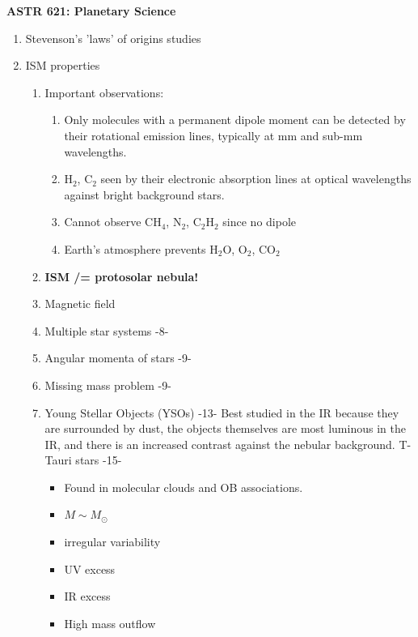 \documentclass[12pt]{article}
\begin{document}
\textbf{ASTR 621: Planetary Science}

\begin{enumerate}
    \item Stevenson's 'laws' of origins studies
    \item ISM properties
        \begin{enumerate}
            \item Important observations:
                \begin{enumerate}
                    \item Only molecules with a permanent dipole moment can be detected by
                        their rotational emission lines, typically at mm and sub-mm
                        wavelengths.
                    \item H$_{2}$, C$_{2}$ seen by their electronic absorption lines at
                        optical wavelengths against bright background stars.
                    \item Cannot observe CH$_{4}$, N$_{2}$, C$_{2}$H$_{2}$ since no dipole
                    \item Earth's atmosphere prevents H$_{2}$O, O$_{2}$, CO$_{2}$
                \end{enumerate}
            \item \textbf{ISM /= protosolar nebula!}
            \item Magnetic field
            \item Multiple star systems -8-
            \item Angular momenta of stars -9-
            \item Missing mass problem -9-
            \item Young Stellar Objects (YSOs) -13-
                Best studied in the IR because they are surrounded by dust,
                the objects themselves are most luminous in the IR, and there
                is an increased contrast against the nebular background.
                T-Tauri stars -15-
                \begin{itemize}
                    \item Found in molecular clouds and OB associations.
                    \item $M \sim M_{\odot}$
                    \item irregular variability
                    \item UV excess
                    \item IR excess
                    \item High mass outflow

\end{itemize}
\end{enumerate}
\end{enumerate}
\end{document}
